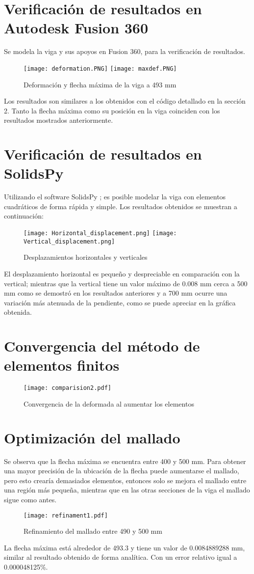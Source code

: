 \documentclass[11pt,a4paper]{article}
\begin{document}
\section{Verificación de resultados en Autodesk Fusion 360}
Se modela la viga y sus apoyos en Fusion 360, para la verificación de resultados.
\begin{figure}[H]
    \centering
    \texttt{[image: deformation.PNG]}
    \texttt{[image: maxdef.PNG]}
    \caption{Deformación y flecha máxima de la viga a 493 mm}
\end{figure}
Los resultados son similares a los obtenidos con el código detallado en la sección 2. Tanto la flecha máxima como su posición en la viga coinciden con los resultados mostrados anteriormente.
\section{Verificación de resultados en SolidsPy}
Utilizando el software SolidsPy \cite{solidspy}; es posible modelar la viga con elementos cuadráticos de forma rápida y simple. Los resultados obtenidos se muestran a continuación:
\begin{figure}[H]
    \centering
    \texttt{[image: Horizontal\_displacement.png]}
    \texttt{[image: Vertical\_displacement.png]}
    \caption{Desplazamientos horizontales y verticales}
\end{figure}
El desplazamiento horizontal es pequeño y despreciable en comparación con la vertical; mientras que la vertical tiene un valor máximo de 0.008 mm cerca a 500 mm como se demostró en los resultados anteriores y a 700 mm ocurre una variación más atenuada de la pendiente, como se puede apreciar en la gráfica obtenida.
\section*{Convergencia del método de elementos finitos}
\begin{figure}[H]
    \centering
    \texttt{[image: comparision2.pdf]}
    \caption{Convergencia de la deformada al aumentar los elementos}
\end{figure}
\section*{Optimización del mallado}
Se observa que la flecha máxima se encuentra entre 400 y 500 mm. Para obtener una mayor precisión de la ubicación de la flecha puede aumentarse el mallado, pero esto crearía demasiados elementos, entonces solo se mejora el mallado entre una región más pequeña, mientras que en las otras secciones de la viga el mallado sigue como antes.
\begin{figure}[H]
    \centering
    \texttt{[image: refinament1.pdf]}
    \caption{Refinamiento del mallado entre 490 y 500 mm}
\end{figure}
La flecha máxima está alrededor de 493.3 y tiene un valor de 0.0084889288 mm, similar al resultado obtenido de forma analítica. Con un error relativo igual a 0.000048125\%.
\end{document}

